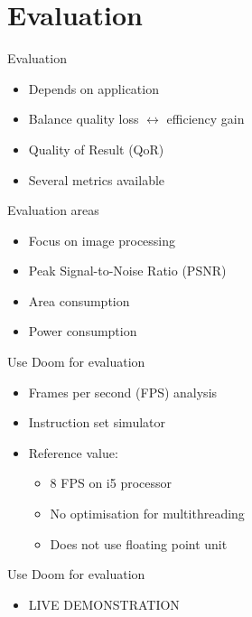 \documentclass{beamer}
\begin{document}
\section{Evaluation}
\begin{frame}{Evaluation}
    \begin{itemize}
        \item<1-> Depends on application
        \item<2-> Balance quality loss $\leftrightarrow$ efficiency gain
        \item<3-> Quality of Result (QoR)
        \item<4-> Several metrics available
    \end{itemize}
\end{frame}

\begin{frame}{Evaluation areas}
    \begin{itemize}
        \item<1-> Focus on image processing
        \item<2-> Peak Signal-to-Noise Ratio (PSNR)
        \item<3-> Area consumption
        \item<4-> Power consumption
    \end{itemize}
\end{frame}

\begin{frame}{Use Doom for evaluation}
    \begin{itemize}
        \item<1-> Frames per second (FPS) analysis
        \item<2-> Instruction set simulator
        \item<3-> Reference value: 
            \begin{itemize}
                \item<1-> 8 FPS on i5 processor
                \item<2-> No optimisation for multithreading
                \item<3-> Does not use floating point unit
            \end{itemize}
    \end{itemize}
\end{frame}

\begin{frame}{Use Doom for evaluation}
    \begin{itemize}
        \item<1-> LIVE DEMONSTRATION 
    \end{itemize}    
\end{frame}
\end{document}
